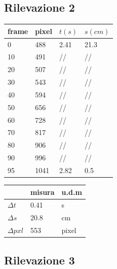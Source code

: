 
\newpage
\subsection{Rilevazione 2}

\begin{tabular}{ | m{3em} | m{3em} | m{2.5em}| m{2.5em} | } 
 \hline
 \vspace{5pt} frame \vspace{5pt}  &  pixel & $t(s)$ & $s(cm)$\\ 
 \hline
 \hline
 0 & 488 & 2.41  & 21.3\\ 
 \hline
 10 & 491 & //  & //\\
 \hline
 20 & 507 & //  & //\\ 
 \hline
 30 & 543 & //  & //\\ 
 \hline
 40 & 594 & //  & //\\ 
 \hline
 50 & 656 & //  & //\\ 
 \hline
 60 & 728 & //  & //\\ 
 \hline
 70 & 817 & //  & //\\ 
 \hline
 80 & 906 & //  & //\\ 
 \hline
 90 & 996 & //  & //\\ 
 \hline
 95 & 1041 & 2.82  & 0.5\\ 
 \hline
\end{tabular}
\quad
\begin{tabular}{ | m{3em} | m{3em} | m{1cm}| } 
 \hline
   &  misura & u.d.m \\ 
 \hline
 \hline
 $\Delta t$   &  0.41 	& s\\
 \hline
 $\Delta s$   &  20.8	& cm\\
 \hline
 $\Delta pxl$ & 553	& pixel\\
 \hline
\end{tabular}




\newpage
\subsection{Rilevazione 3}

